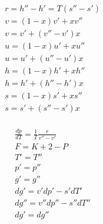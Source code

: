 \documentclass[twocolumn]{article}
\begin{document}
\begin{multicols}{2}
\begin{align*}
	& r = h'' - h' = T(s''-s') \\
	& v = (1-x)v' + xv{''} \\
	& v = v' + (v''-v')x \\ 
	& u = (1-x) u' + xu'' \\
	& u = u' + (u''-u')x \\
	& h = (1-x) h' + xh'' \\
	& h = h' + (h''-h')x \\
	& s = (1-x) s' + xs'' \\
	& s = s' + (s''-s')x \\
\end{align*}

\begin{align*}
	& \frac{dp}{dT} = \frac{1}{T}\frac{r}{v'' -v'}  \\
	& F  = K + 2 - P \\
	& T' = T'' \\
	& p' = p'' \\
	& g' = g'' \\
	&dg' = v'dp' - s'dT' \\
	&dg'' = v'' dp'' - s'' dT'' \\
	&dg' = dg'' \\
\end{align*}
\end{multicols}


%                                                                         
\end{document}
